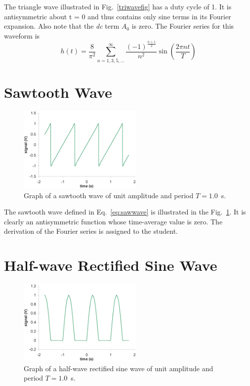 \documentclass{revtex4}
\begin{document}
The triangle wave illustrated in Fig.~\ref{triwavefig} has a duty cycle of
1. It is antisymmetric about t = 0 and thus contains only sine terms in its
Fourier expansion. Also note that the {\em dc} term $A_0$ is zero. 
The Fourier series for this waveform is
\begin{equation}
h(t) = \frac{8}{\pi^2}\sum_{n=1,3,5,\ldots}^{\infty}
\frac{(-1)^{\frac{n+1}{2}}}{n^2}\sin\left(\frac{2\pi nt}{T}\right)
\label{eq:triwave}
\end{equation}

\section{Sawtooth Wave}

\begin{figure}
\includegraphics[width=6cm]{sawwavefig.eps}
\caption{\label{sawwavefig} 
Graph of a sawtooth wave of unit amplitude and period $T=1.0$~s.}
\end{figure}

The sawtooth wave defined in Eq.~\ref{eq:sawwave} is illustrated in
the Fig.~\ref{sawwavefig}.  It is clearly an antisymmetric function
whose time-average value is zero. The derivation of the Fourier series
is assigned to the student.

\section{Half-wave Rectified Sine Wave}

\begin{figure}
\includegraphics[width=6cm]{rsinwavefig.eps}
\caption{\label{rsinwavefig} 
Graph of a half-wave rectified sine wave of unit amplitude
and period $T=1.0$~s.}
\end{figure}
\end{document}
